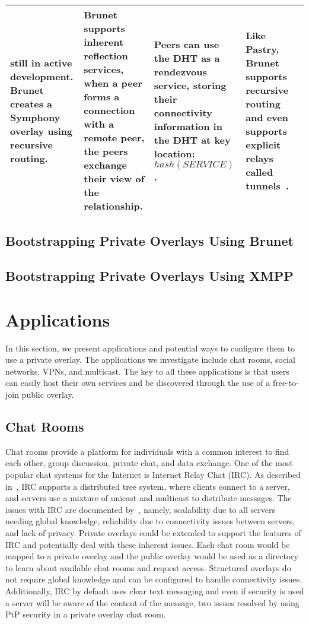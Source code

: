 \documentclass[conference]{IEEEtran}
\begin{document}
\begin{table*}[h!t!]
\begin{tabular}[c]{|m{1.5cm}||m{5.5cm}|m{3cm}|m{3cm}|m{3cm}|}
still in active development.  Brunet creates a Symphony~\cite{symphony} overlay
using recursive routing.
&
Brunet supports inherent reflection services, when a peer forms a connection
with a remote peer, the peers exchange their view of the relationship.
&
Peers can use the DHT as a rendezvous service, storing their connectivity
information in the DHT at key location:  $hash(SERVICE)$.
&
Like Pastry, Brunet supports recursive routing and even supports explicit
relays called tunnels~\cite{hpdc08_0}.
\\ \hline
\end{tabular}
\caption{}
\label{tab:overlays}
\end{table*}

\subsection{Bootstrapping Private Overlays Using Brunet}
\subsection{Bootstrapping Private Overlays Using XMPP}

\section{Applications}
\label{applications}
In this section, we present applications and potential ways to configure them
to use a private overlay.  The applications we investigate include chat rooms,
social networks, VPNs, and multicast.  The key to all these applications is that
users can easily host their own services and be discovered through the use of
a free-to-join public overlay.

\subsection{Chat Rooms}
Chat rooms provide a platform for individuals with a common interest to find
each other, group discussion, private chat, and data exchange.  One of the most
popular chat systems for the Internet is Internet Relay Chat (IRC).  As
described in~\cite{irc}, IRC supports a distributed tree system, where clients
connect to a server, and servers use a mixture of unicast and multicast to
distribute messages.  The issues with IRC are documented by~\cite{irc_arch},
namely, scalability due to all servers needing global knowledge, reliability
due to connectivity issues between servers, and lack of privacy.  Private
overlays could be extended to support the features of IRC and potentially deal
with these inherent issues.  Each chat room would be mapped to a private
overlay and the public overlay would be used as a directory to learn about
available chat rooms and request access.  Structured overlays do not require
global knowledge and can be configured to handle connectivity issues.
Additionally, IRC by default uses clear text messaging and even if security is
used a server will be aware of the content of the message, two issues resolved
by using PtP security in a private overlay chat room.  
\end{document}
